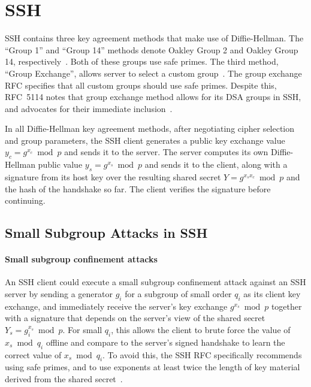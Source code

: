 
\section{SSH}

SSH contains three key agreement methods that make use of Diffie-Hellman. The
``Group 1'' and ``Group 14'' methods denote Oakley Group 2 and Oakley Group
14, respectively~\cite{rfc4253}. Both of these groups use safe primes. The
third method, ``Group Exchange'', allows server to select a custom
group~\cite{rfc4419}. The group exchange RFC specifies that all custom groups
should use safe primes. Despite this, RFC~5114 notes that group exchange method
allows for its DSA groups in SSH, and advocates for their immediate
inclusion~\cite{rfc5114}.

\SSHHostValidationTable

In all Diffie-Hellman key agreement methods, after negotiating cipher selection and group parameters, 
the SSH client generates a public
key exchange value $y_c = g^{x_c} \bmod p$ and sends it to the server. The
server computes its own Diffie-Hellman public value $y_s = g^{x_s} \bmod p$ and
sends it to the client, along with a signature from its host key over the
resulting shared secret $Y = g^{x_s x_c} \bmod p$ and the hash of the handshake
so far.  The client verifies the signature before continuing.

\subsection{Small Subgroup Attacks in SSH}

\paragraph{Small subgroup confinement attacks}
An SSH client could execute a small subgroup confinement attack against an SSH
server by sending a generator $g_i$ for a subgroup of small order $q_i$ as its
client key exchange, and immediately receive the server's key exchange $g^{x_s}
\bmod p$ together with a signature that depends on the server's view of the
shared secret $Y_s = g_i^{x_s} \bmod p$. For small $q_i$, this allows the
client to brute force the value of $x_s \bmod q_i$ offline and compare to the
server's signed handshake to learn the correct value of $x_s \bmod q_i$. To
avoid this, the SSH RFC specifically recommends using safe primes, and to use
exponents at least twice the length of key material derived from the shared
secret~\cite{rfc4419}. 

